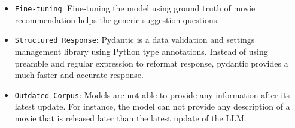 \documentclass[journal]{IEEEtran}
\theoremstyle{mydefstyle}
\begin{document}
\begin{itemize}
    \item \texttt{Fine-tuning}: Fine-tuning the model using ground truth of movie recommendation helps the generic suggestion questions.

    \item \texttt{Structured Response}: Pydantic is a data validation and settings management library using Python type annotations. Instead of using preamble and regular expression to reformat response, pydantic provides a much faster and accurate response.

    \item \texttt{Outdated Corpus}: Models are not able to provide any information after its latest update. For instance, the model can not provide any description of a movie that is released later than the latest update of the LLM. 
\end{itemize}

\end{document}
